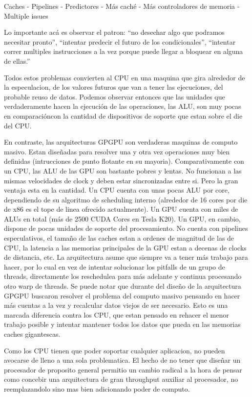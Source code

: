 Caches - Pipelines - Predictores - M\'as cach\'e - M\'as controladores de memoria - Multiple issues

Lo importante ac\'a es observar el patron: ``no desechar algo que podramos necesitar pronto'',
``intentar predecir el futuro de los condicionales'', ``intentar correr multiples instrucciones a la vez
porque puede llegar a bloquear en alguna de ellas.''

Todos estos problemas convierten al CPU en una maquina que gira alrededor de la especulacion,
de los valores futuros que van a tener las ejecuciones, del probable reuso de datos.
Podemos observar entonces que las unidades que verdaderamente hacen la ejecuci\'on de las operaciones,
las ALU, son muy pocas en comparaci\'oncon la cantidad de dispositivos de soporte que estan
sobre el die del CPU.

En contraste, las arquitecturas GPGPU son verdaderas maquinas de computo masivo. Estan dise\~nadas para
resolver una y otra vez operaciones muy bien definidas (intrucciones de punto flotante en su mayoria).
Comparativamente con un CPU, las ALU de las GPU son bastante pobres y lentas. No funcionan a las mismas
velocidades de clock y deben estar sincronizadas entre si. Pero la gran ventaja esta en la cantidad.
Un CPU cuenta con unas pocas ALU por core, dependiendo de su algoritmo de scheduling interno
(alrededor de 16 cores por die de x86 es el tope de linea ofrecido actualmente). Un GPU cuenta con miles de ALUs en total
(m\'as de 2500 CUDA Cores en Tesla K20). Un GPU, en cambio, dispone de pocas unidades de soporte del procesamiento.
No cuenta con pipelines especulativos, el tama\~no de las caches
estan a ordenes de magnitud de las de CPU, la latencia a las memorias principales de la GPU estan a
decenas de clocks de distancia, etc. La arquitectura asume que siempre va a tener m\'as trabajo
para hacer, por lo cual en vez de intentar solucionar los pitfalls de un grupo de threads, directamente
los reschedulea para m\'as adelante y continua procesando otro warp de threads. Se puede notar que durante del
dise\~no de la arquitectura GPGPU buscaron resolver el problema del computo masivo pensando en hacer
m\'as cuentas a la vez y recalcular datos viejos de ser necesario. Esto es una marcada diferencia contra
los CPU, que estan pensado en rehacer el menor trabajo posible y intentar mantener todos los datos que pueda en
las memorias caches gigantescas.

Como los CPU tienen que poder soportar cualquier aplicacion, no pueden avocarse de lleno a una sola
problematica. El hecho de no tener que dise\~nar un procesador de proposito general permitio un cambio radical
a la hora de pensar como concebir una arquitectura de gran throughput auxiliar al procesador, no reemplazandolo
sino mas bien adicionando poder de computo.~\cite{GlaskowskyFermi}

